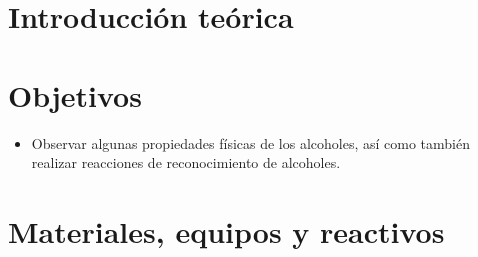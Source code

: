 
\section{Introducción teórica}

\section{Objetivos}

\begin{itemize}
    \item Observar algunas propiedades físicas de los alcoholes, así como también realizar reacciones de reconocimiento de alcoholes.
\end{itemize}

\section{Materiales, equipos y reactivos}

